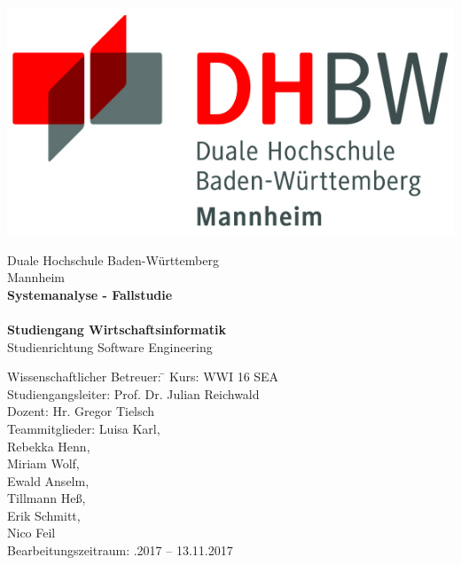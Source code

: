 \begin{titlepage}
\begin{minipage}{\textwidth}
		\vspace{-2cm}
		\noindent  
		\centering \includegraphics{img/logo.jpg}
\end{minipage}
\vspace{1em}
\sffamily
\begin{center}
	\textsf{\large{}Duale Hochschule Baden-W\"urttemberg\\[1.5mm] Mannheim}\\[2em]
	\textsf{\textbf{\Large{}Systemanalyse - Fallstudie}}\\[3mm]
	\textsf{\textbf{\DerTitelDerArbeit}} \\[1.5cm]
	\textsf{\textbf{\Large{}Studiengang Wirtschaftsinformatik}\\[3mm] \textsf{Studienrichtung Software Engineering}}
	
	\vspace{5em}

\begin{minipage}{\textwidth}

\begin{tabbing}
	Wissenschaftlicher Betreuer:
	\hspace{0.5cm}\=\kill
	Kurs: \> WWI 16 SEA \\[1.5mm]
	Studiengangsleiter: \> Prof. Dr. Julian Reichwald  \\[1.5mm]
	Dozent: \> Hr. Gregor Tielsch  \\[1.5mm]
	Teammitglieder: \> Luisa Karl, \\ \> Rebekka Henn, \\ \> Miriam Wolf, \\ \> Ewald Anselm, \\ \> Tillmann Heß, \\ \> Erik Schmitt, \\ \> Nico Feil \\[1.5mm]
	Bearbeitungszeitraum: .2017 -- 13.11.2017
\end{tabbing}
\end{minipage}

\end{center}

\end{titlepage}